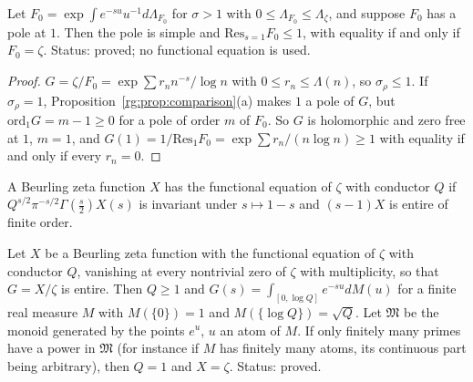 \begin{proposition}\label{rg:prop:residue}
Let $F_0=\exp\int e^{-su}u^{-1}d\Lambda_{F_0}$ for $\sigma>1$ with $0\le\Lambda_{F_0}\le\Lambda_\zeta$, and suppose $F_0$ has a pole at $1$. Then the pole is simple and $\mathrm{Res}_{s=1}F_0\le1$, with equality if and only if $F_0=\zeta$. Status: proved; no functional equation is used.
\end{proposition}

\begin{proof}
$G=\zeta/F_0=\exp\sum r_nn^{-s}/\log n$ with $0\le r_n\le\Lambda(n)$, so $\sigma_\rho\le1$. If $\sigma_\rho=1$, Proposition~\ref{rg:prop:comparison}(a) makes $1$ a pole of $G$, but $\mathrm{ord}_1G=m-1\ge0$ for a pole of order $m$ of $F_0$. So $G$ is holomorphic and zero free at $1$, $m=1$, and $G(1)=1/\mathrm{Res}_1F_0=\exp\sum r_n/(n\log n)\ge1$ with equality if and only if every $r_n=0$. \qedhere
\end{proof}

A Beurling zeta function $X$ has the functional equation of $\zeta$ with conductor $Q$ if $Q^{s/2}\pi^{-s/2}\Gamma(\frac s2)X(s)$ is invariant under $s\mapsto1-s$ and $(s-1)X$ is entire of finite order.

\begin{theorem}\label{rg:thm:B}
Let $X$ be a Beurling zeta function with the functional equation of $\zeta$ with conductor $Q$, vanishing at every nontrivial zero of $\zeta$ with multiplicity, so that $G=X/\zeta$ is entire. Then $Q\ge1$ and $G(s)=\int_{[0,\log Q]}e^{-su}dM(u)$ for a finite real measure $M$ with $M(\{0\})=1$ and $M(\{\log Q\})=\sqrt Q$. Let $\mathfrak M$ be the monoid generated by the points $e^u$, $u$ an atom of $M$. If only finitely many primes have a power in $\mathfrak M$ (for instance if $M$ has finitely many atoms, its continuous part being arbitrary), then $Q=1$ and $X=\zeta$. Status: proved.
\end{theorem}

